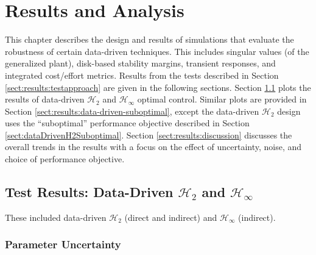 \chapter{Results and Analysis}
\label{chap:results}
This chapter describes the design and results of simulations that evaluate the robustness of certain data-driven techniques.  This includes singular values (of the generalized plant), disk-based stability margins, transient responses, and integrated cost/effort metrics.  Results from the tests described in Section \ref{sect:results:testapproach} are given in the following sections.  Section \ref{sect:results:data-driven-optimal} plots the results of data-driven $\mathcal{H}_{2}$ and $\mathcal{H}_{\infty}$ optimal control.  Similar plots are provided in Section \ref{sect:results:data-driven-suboptimal}, except the data-driven $\mathcal{H}_{2}$ design uses the ``suboptimal'' performance objective described in Section \ref{sect:dataDrivenH2Suboptimal}.  Section \ref{sect:results:discussion} discusses the overall trends in the results with a focus on the effect of uncertainty, noise, and choice of performance objective.

\newpage
\section{Test Results: Data-Driven $\mathcal{H}_{2}$ and $\mathcal{H}_{\infty}$}
\label{sect:results:data-driven-optimal}
These included data-driven $\mathcal{H}_{2}$ (direct and indirect) and $\mathcal{H}_{\infty}$ (indirect).
\subsection{Parameter Uncertainty}
